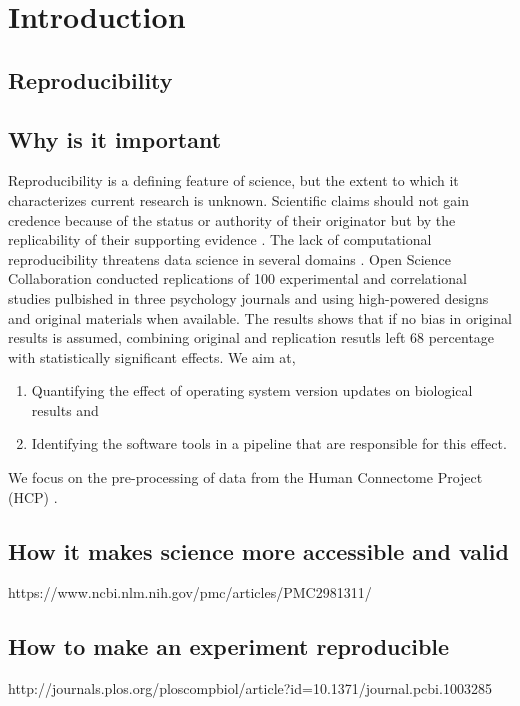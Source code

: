 \chapter{Introduction}
\section{Reproducibility}
\section{Why is it important}
Reproducibility is a defining feature of science, but the extent to which it characterizes current research is unknown. Scientific claims should not gain credence because of the status or authority of their originator but by the replicability of their supporting evidence \cite{aac4716}. The lack of computational reproducibility threatens data science in several domains \cite{Gla15}. Open Science Collaboration \cite{aac4716} conducted replications of 100 experimental and correlational studies pulbished in three psychology journals and using high-powered designs and original materials when available. The results shows that if no bias in original results is assumed, combining original and replication resutls left 68 percentage with statistically significant effects.
We aim at,
\begin{enumerate} 
  \item  Quantifying the effect of operating system version updates on biological results and 
  \item  Identifying the software tools in a pipeline that are responsible for this effect.
\end{enumerate} 
We focus on the pre-processing of data from the Human Connectome Project (HCP) \cite{Gla13}.
\section{How it makes science more accessible and valid}
https://www.ncbi.nlm.nih.gov/pmc/articles/PMC2981311/
\section{How to make an experiment reproducible}
http://journals.plos.org/ploscompbiol/article?id=10.1371/journal.pcbi.1003285

